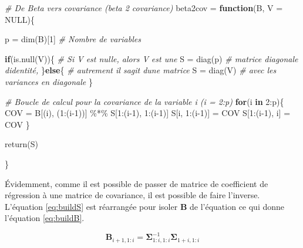 \documentclass[
]{book}
\newenvironment{Shaded}{}{}
\newcommand{\AttributeTok}[1]{#1}
\newcommand{\CommentTok}[1]{\textit{#1}}
\newcommand{\ConstantTok}[1]{#1}
\newcommand{\ControlFlowTok}[1]{\textbf{#1}}
\newcommand{\DecValTok}[1]{#1}
\newcommand{\FunctionTok}[1]{#1}
\newcommand{\NormalTok}[1]{#1}
\newcommand{\OtherTok}[1]{#1}
\newcommand{\SpecialCharTok}[1]{#1}
\begin{document}
\begin{Shaded}
\begin{Highlighting}[]
\CommentTok{\# De Beta vers covariance (beta 2 covariance)}
\NormalTok{beta2cov }\OtherTok{=} \ControlFlowTok{function}\NormalTok{(B, }\AttributeTok{V =} \ConstantTok{NULL}\NormalTok{)\{}
  
\NormalTok{  p }\OtherTok{=} \FunctionTok{dim}\NormalTok{(B)[}\DecValTok{1}\NormalTok{]                 }\CommentTok{\# Nombre de variables}
  
  \ControlFlowTok{if}\NormalTok{(}\FunctionTok{is.null}\NormalTok{(V))\{               }\CommentTok{\# Si V est nulle, alors V est une}
\NormalTok{    S }\OtherTok{=} \FunctionTok{diag}\NormalTok{(p)                 }\CommentTok{\# matrice diagonale d\textquotesingle{}identité,}
\NormalTok{  \}}\ControlFlowTok{else}\NormalTok{\{                        }\CommentTok{\# autrement il s\textquotesingle{}agit d\textquotesingle{}une matrice}
\NormalTok{    S }\OtherTok{=} \FunctionTok{diag}\NormalTok{(V)                 }\CommentTok{\# avec les variances en diagonale}
\NormalTok{  \}  }
  
  \CommentTok{\# Boucle de calcul pour la covariance de la variable i (i = 2:p)}
  \ControlFlowTok{for}\NormalTok{(i }\ControlFlowTok{in} \DecValTok{2}\SpecialCharTok{:}\NormalTok{p)\{}
\NormalTok{    COV }\OtherTok{=}\NormalTok{ B[(i), (}\DecValTok{1}\SpecialCharTok{:}\NormalTok{(i}\DecValTok{{-}1}\NormalTok{))] }\SpecialCharTok{\%*\%}\NormalTok{ S[}\DecValTok{1}\SpecialCharTok{:}\NormalTok{(i}\DecValTok{{-}1}\NormalTok{), }\DecValTok{1}\SpecialCharTok{:}\NormalTok{(i}\DecValTok{{-}1}\NormalTok{)]}
\NormalTok{    S[i, }\DecValTok{1}\SpecialCharTok{:}\NormalTok{(i}\DecValTok{{-}1}\NormalTok{)] }\OtherTok{=}\NormalTok{ COV}
\NormalTok{    S[}\DecValTok{1}\SpecialCharTok{:}\NormalTok{(i}\DecValTok{{-}1}\NormalTok{), i] }\OtherTok{=}\NormalTok{ COV}
\NormalTok{  \}}
  
  \FunctionTok{return}\NormalTok{(S)}
  
\NormalTok{\}}
\end{Highlighting}
\end{Shaded}

Évidemment, comme il est possible de passer de matrice de coefficient de régression à une matrice de covariance, il est possible de faire l'inverse. L'équation \eqref{eq:buildS} est réarrangée pour isoler \(\mathbf{B}\) de l'équation ce qui donne l'équation \eqref{eq:buildB}.

\begin{equation}
\mathbf{B}_{i+1, 1:i} = \mathbf{\Sigma}^{-1}_{1:i,1:i}\mathbf{\Sigma}_{1+i,1:i}
\label{eq:buildB}
\end{equation}
\end{document}
